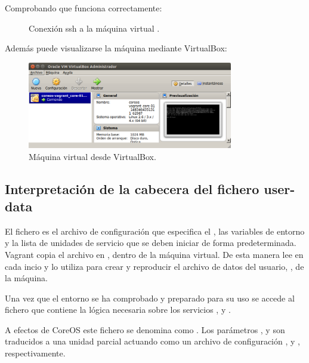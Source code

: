 
Comprobando que funciona correctamente:

\begin{figure}[H]
\caption{Conexión ssh a la máquina virtual .}
\end{figure}

Además puede visualizarse la máquina mediante VirtualBox:

\begin{figure}[H]
\centering
\includegraphics[width=0.8\textwidth]{images/figures/vboxcore01.png}
\caption{Máquina virtual  desde VirtualBox.}
\end{figure}

\subsection{Interpretación de la cabecera del fichero user-data}

El fichero  es el archivo de configuración  que especifica el , las variables de entorno y la lista de unidades de servicio que se deben iniciar de forma predeterminada. Vagrant copia el archivo  en , dentro de la máquina virtual. De esta manera  lee  en cada incio y lo utiliza para crear y reproducir el archivo de datos del usuario, , de la máquina.

Una vez que el entorno se ha comprobado y preparado para su uso se accede al fichero  que contiene la lógica necesaria sobre los servicios ,  y .

A efectos de CoreOS este fichero se denomina como . Los parámetros ,  y  son traducidos a una unidad  parcial actuando como un archivo de configuración ,  y , respectivamente. 

